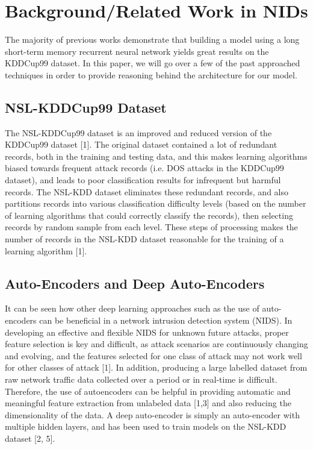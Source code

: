 \documentclass[a4paper]{article}
\begin{document}
\section{Background/Related Work in NIDs}
\hspace*{10mm}The majority of previous works demonstrate that building a model using a long short-term memory recurrent neural network yields great results on the KDDCup99 dataset. In this paper, we will go over a few of the past approached techniques in order to provide reasoning behind the architecture for our model.

\subsection{NSL-KDDCup99 Dataset}
\hspace*{10mm}The NSL-KDDCup99 dataset is an improved and reduced version of the KDDCup99 dataset [1]. The original dataset contained a lot of redundant records, both in the training and testing data, and this makes learning algorithms biased towards frequent attack records (i.e. DOS attacks in the KDDCup99 dataset), and leads to poor classification results for infrequent but harmful records. The NSL-KDD dataset eliminates these redundant records, and also partitions records into various classification difficulty levels (based on the number of learning algorithms that could correctly classify the records), then selecting records by random sample from each level. These steps of processing makes the number of records in the NSL-KDD dataset reasonable for the training of a learning algorithm [1].

\subsection{Auto-Encoders and Deep Auto-Encoders}
\hspace*{10mm}It can be seen how other deep learning approaches such as the use of auto-encoders can be beneficial in a network intrusion detection system (NIDS). In developing an effective and flexible NIDS for unknown future attacks, proper feature selection is key and difficult, as attack scenarios are continuously changing and evolving, and the features selected for one class of attack may not work well for other classes of attack [1]. In addition, producing a large labelled dataset from raw network traffic data collected over a period or in real-time is difficult. Therefore, the use of autoencoders can be helpful in providing automatic and meaningful feature extraction from unlabeled data [1,3] and also reducing the dimensionality of the data. A deep auto-encoder is simply an auto-encoder with multiple hidden layers, and has been used to train models on the NSL-KDD dataset [2, 5].
\end{document}
